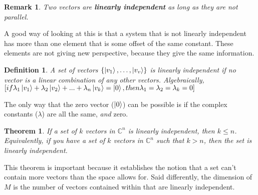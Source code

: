 \documentclass[12pt]{article}
\theoremstyle{plain}
\newtheorem{theorem}[lemma]{Theorem}
\theoremstyle{nonumberplain}
\theoremstyle{plain}
\newtheorem{definition}[lemma]{Definition}
\newtheorem{remark}[lemma]{Remark}
\theoremstyle{nonumberplain}
\newcommand\1{{\bf 1}}
\newcommand{\setovecs}[1]{\lb \ket{v_1}, \ldots, \ket{v_{#1}}\rb} %
\newcommand{\C}{\mathbb{C}} %
\newcommand{\<}{\left\langle}
\renewcommand{\>}{\right\rangle}
\newcommand{\lb}{\left\{}
\newcommand{\rb}{\right\}}
\begin{document}
\begin{remark}
Two vectors are \textbf{linearly independent} as long as they are not \textit{parallel}.
\end{remark}

A good way of looking at this is that a system that is not linearly independent has more than one element that is some offset of the same constant. These elements are not giving new perspective, because they give the same information.

\begin{definition}\label{•}
A set of vectors $\setovecs{v}$ is linearly independent if no vector is a linear combination of any other vectors. Algebraically, $[if \lambda_1\ket{v_1} + \lambda_2\ket{v_2} + ... + \lambda_n\ket{v_k}=\ket{0}, then \lambda_1=\lambda_2=\lambda_k=0]$
\end{definition}

The only way that the zero vector ($\ket{0}$) can be possible is if the complex constants ($\lambda$) are all the same, \textit{and} zero.

\begin{theorem}
If a set of $k$ vectors in $\C^n$ is linearly independent, then $k \leq n$. Equivalently, if you have a set of $k$ vectors in $\C^n$ such that $k>n$, then the set is linearly independent.
\end{theorem}

This theorem is important because it establishes the notion that a set can't contain more vectors than the space allows for. Said differently, the dimension of $M$ is the number of vectors contained within that are linearly independent.

\end{document}
